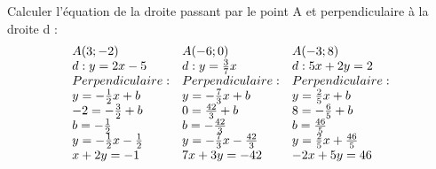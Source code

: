 \begin{solution}
Calculer l'équation de la droite passant par le point A et perpendiculaire à la droite d :
$$
\begin{array}{lll}
\begin{array}[c]{@{}l@{}}  A(3;-2)  \\     d:y=2x-5  \\   \end{array} & \begin{array}[c]{@{}l@{}}  A(-6;0)  \\     d:y=\frac{3}{7}x  \\   \end{array} & \begin{array}[c]{@{}l@{}}    A(-3;8)  \\       d:5x+2y=2  \\   \end{array} \\
Perpendiculaire :                                                                                             & Perpendiculaire :                                                                                                        & Perpendiculaire :                                                                                                      \\
y=-\frac{1}{2}x+b                                                                                          & y=-\frac{7}{3}x+b                                                                                                     & y=\frac{2}{5}x+b                                                                                                    \\
-2=-\frac{3}{2}+b                                                                                          & 0=\frac{42}{3}+b                                                                                                      & 8=-\frac{6}{5}+b                                                                                                    \\
b=-\frac{1}{2}                                                                                             & b=-\frac{42}{3}                                                                                                       & b=\frac{46}{5}                                                                                                      \\
y=-\frac{1}{2}x-\frac{1}{2}                                                                             & y=-\frac{7}{3}x-\frac{42}{3}                                                                                       & y=\frac{2}{5}x+\frac{46}{5}                                                                                      \\
x+2y=-1                                                                                                     & 7x+3y=-42
 & -2x+5y=46              
\end{array}
$$
\end{solution}